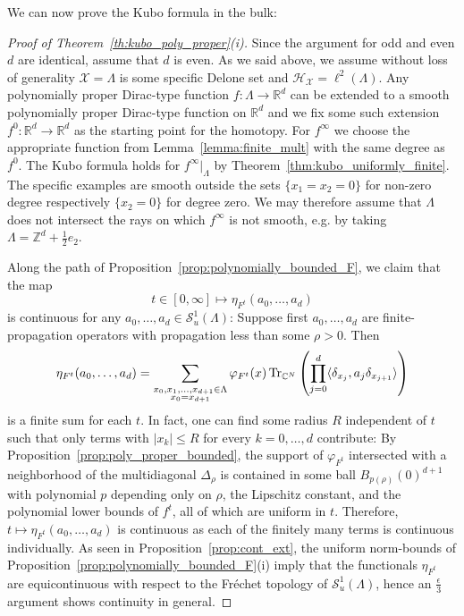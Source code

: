 \documentclass[12pt]{amsart}
\newcommand{\CM}{{\mathbb C}}
\newcommand{\RM}{{\mathbb R}}
\newcommand{\ZM}{{\mathbb Z}}
\newcommand{\Ss}{{\mathcal S}}
\newcommand{\Hh}{{\mathcal H}}
\newcommand{\Xx}{{\mathcal X}}
\newcommand{\Tr}{\mbox{\rm Tr}}
\begin{document}
We can now prove the Kubo formula in the bulk:
\begin{proof}[Proof of Theorem~\ref{th:kubo_poly_proper}(i)]
Since the argument for odd and even $d$ are identical, assume that $d$ is even. As we said above, we assume without loss of generality $\Xx=\Lambda$ is some specific Delone set and $\Hh_\Xx=\ell^2(\Lambda)$. Any polynomially proper Dirac-type function $f:\Lambda\to \RM^d$ can be extended to a smooth polynomially proper Dirac-type function on $\RM^d$ and we fix some such extension $f^0:\RM^d\to \RM^d$ as the starting point for the homotopy. For $f^\infty$ we choose the appropriate function from Lemma~\ref{lemma:finite_mult} with the same degree as $f^0$. The Kubo formula holds for $f^\infty\rvert_\Lambda$ by Theorem~\ref{thm:kubo_uniformly_finite}. The specific examples are smooth outside the sets $\{x_1=x_2=0\}$ for non-zero degree respectively $\{x_2=0\}$ for degree zero. We may therefore assume that $\Lambda$ does not intersect the rays on which $f^\infty$ is not smooth, e.g. by taking $\Lambda=\ZM^d+\frac12 e_2$.

Along the path of Proposition~\ref{prop:polynomially_bounded_F}, we claim that the map
$$t\in [0,\infty] \mapsto \eta_{F^t}(a_0,\dots,a_d)$$
is continuous for any $a_0,\dots,a_d\in \Ss^1_u(\Lambda)$: Suppose first $a_0,\dots,a_d$ are finite-propagation operators with propagation less than some $\rho>0$. 
Then 
\begin{align*}
\eta_{F^t}(a_0,\dots,a_d)= \sum_{\substack{x_0,x_1,\dots,x_{d+1} \in \Lambda\\ x_0=x_{d+1}}}\varphi_{F^t}(x) \, \Tr_{\CM^N}\left(\prod_{j=0}^{d} \langle\delta_{x_j}, a_j\delta_{x_{j+1}}\rangle\right)
\end{align*}
is a finite sum for each $t$. In fact, one can find some radius $R$ independent of $t$ such that only terms with $|x_k|\leq R$ for every $k=0,\ldots,d$ contribute: 
By Proposition~\ref{prop:poly_proper_bounded}, the support of $\varphi_{F^t}$ intersected with a neighborhood of the multidiagonal $\Delta_\rho$ is contained in some ball $B_{p(\rho)}(0)^{d+1}$ with polynomial $p$ depending only on $\rho$, the Lipschitz constant, and the polynomial lower bounds of $f^t$, all of which are uniform in $t$. 
Therefore, $t\mapsto \eta_{F^t}(a_0,\dots,a_d)$ is continuous as each of the finitely many terms is continuous individually. 
As seen in Proposition~\ref{prop:cont_ext}, the uniform norm-bounds of Proposition~\ref{prop:polynomially_bounded_F}(i) imply that the functionals $\eta_{F^t}$ are equicontinuous with respect to the Fr\'echet topology of $\Ss_u^1(\Lambda)$, hence an $\frac{\epsilon}{3}$ argument shows continuity in general.


\end{proof}
\end{document}
